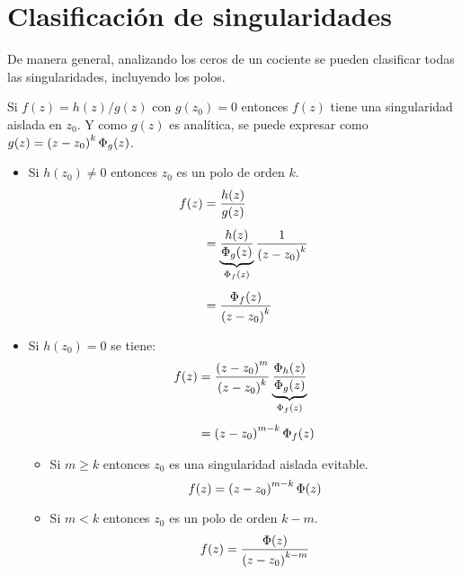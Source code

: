 \documentclass[a5paper,12pt,twoside]{book}
\begin{document}
\section{Clasificación de singularidades}

De manera general, analizando los ceros de un cociente se pueden clasificar todas las singularidades, incluyendo los polos.

Si $f(z) = h(z)/g(z)$ con $g(z_0)=0$ entonces $f(z)$ tiene una singularidad aislada en $z_0$. Y como $g(z)$ es analítica, se puede expresar como $g(z)=\left(z-z_0\right)^k \Phi_g (z)$.

\begin{itemize}
    \item {}
    
    Si $h(z_0) \neq 0$ entonces $z_0$ es un polo de orden $k$.
    \begin{align*}
        f(z) &= \frac{h(z)}{g(z)}
        \\[1ex]
        &= \underbrace{\frac{h(z)}{\Phi_g (z)}}_{\Phi_f (z)} \frac{1}{\left(z-z_0\right)^k}
        \\[1ex]
        &= \frac{\Phi_f (z)}{\left(z-z_0\right)^k}
    \end{align*}

    \item {}
    
    Si $h(z_0) = 0$ se tiene:
    \begin{align*}
        f(z) &= \frac{\left(z-z_0\right)^m}{\left(z-z_0\right)^k} \underbrace{\frac{\Phi_h (z)}{\Phi_g (z)}}_{\Phi_f (z)}
        \\[1ex]
        &= \left(z-z_0\right)^{m-k} \Phi_f (z)
    \end{align*}
    
    \begin{itemize}
        \item {}
        
        Si $m \geq k$ entonces $z_0$ es una singularidad aislada evitable.
        \begin{equation*}
            f(z) = \left(z-z_0\right)^{m-k} \Phi(z)
        \end{equation*}

        \item {}
        
        Si $m<k$ entonces $z_0$ es un polo de orden $k-m$.
        \begin{equation*}
            f(z) = \frac{\Phi (z)}{\left(z-z_0\right)^{k-m}}
        \end{equation*}
    \end{itemize}
\end{itemize}
\end{document}
